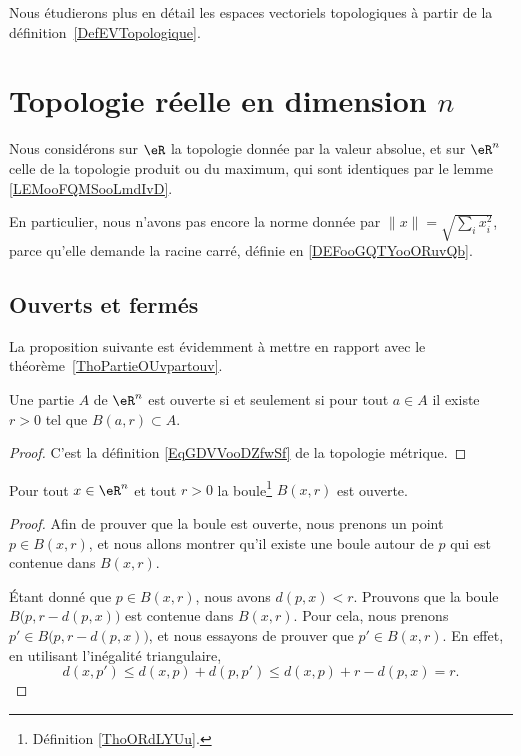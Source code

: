 Nous étudierons plus en détail les espaces vectoriels topologiques à partir de la définition~\ref{DefEVTopologique}.


\section{Topologie réelle en dimension \( n\)}

Nous considérons sur \( \eR\) la topologie donnée par la valeur absolue, et sur \( \eR^n\) celle de la topologie produit ou du maximum, qui sont identiques par le lemme \ref{LEMooFQMSooLmdIvD}.

En particulier, nous n'avons pas encore la norme donnée par \( \| x \|=\sqrt{ \sum_ix_i^2 }\), parce qu'elle demande la racine carré, définie en \ref{DEFooGQTYooORuvQb}.

\subsection{Ouverts et fermés}

La proposition suivante est évidemment à mettre en rapport avec le théorème~\ref{ThoPartieOUvpartouv}.
\begin{proposition}\label{PROPooEQYJooBbPiAj}
	Une partie \( A\) de \( \eR^n\) est ouverte si et seulement si pour tout \( a\in A\) il existe \( r>0\) tel que \( B(a,r)\subset A\).
\end{proposition}

\begin{proof}
	C'est la définition \ref{EqGDVVooDZfwSf} de la topologie métrique.
\end{proof}

\begin{lemma}   \label{LemMESSExh}
	Pour tout \( x \in \eR^n\) et tout \( r >0\) la boule\footnote{Définition \ref{ThoORdLYUu}.} \( B(x,r)\) est ouverte.
\end{lemma}

\begin{proof}
	Afin de prouver que la boule est ouverte, nous prenons un point \( p\in B(x,r)\), et nous allons montrer qu'il existe une boule autour de \( p\) qui est contenue dans \( B(x,r)\).

	Étant donné que \( p\in B(x,r)\), nous avons \( d(p,x)<r\). Prouvons que la boule \( B\big(p,r-d(p,x)\big)\) est contenue dans \( B(x,r)\). Pour cela, nous prenons \( p'\in B\big(p,r-d(p,x)\big)\), et nous essayons de prouver que \( p'\in B(x,r)\). En effet, en utilisant l'inégalité triangulaire,
	\begin{equation}
		d(x,p')\leq d(x,p)+d(p,p')\leq d(x,p)+r-d(p,x)=r.
	\end{equation}
\end{proof}

